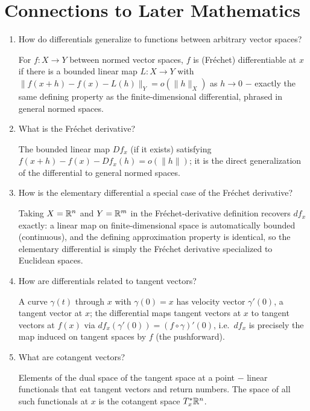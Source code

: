 \documentclass{essay}
\begin{document}
\section{Connections to Later Mathematics}

\begin{enumerate}[resume, leftmargin=*, itemsep=8pt]

\item How do differentials generalize to functions between arbitrary vector spaces?
\begin{answer}
For \(f:X\to Y\) between normed vector spaces, \(f\) is (Fr\'echet) differentiable at \(x\) if there is a bounded linear map \(L:X\to Y\) with \(\|f(x+h)-f(x)-L(h)\|_Y=o(\|h\|_X)\) as \(h\to0\) \(-\) exactly the same defining property as the finite-dimensional differential, phrased in general normed spaces.
\end{answer}

\item What is the Fr\'echet derivative?
\begin{answer}
The bounded linear map \(Df_x\) (if it exists) satisfying \(f(x+h)-f(x)-Df_x(h)=o(\|h\|)\); it is the direct generalization of the differential to general normed spaces.
\end{answer}

\item How is the elementary differential a special case of the Fr\'echet derivative?
\begin{answer}
Taking \(X=\mathbb{R}^n\) and \(Y=\mathbb{R}^m\) in the Fr\'echet-derivative definition recovers \(df_x\) exactly: a linear map on finite-dimensional space is automatically bounded (continuous), and the defining approximation property is identical, so the elementary differential is simply the Fr\'echet derivative specialized to Euclidean spaces.
\end{answer}

\item How are differentials related to tangent vectors?
\begin{answer}
A curve \(\gamma(t)\) through \(x\) with \(\gamma(0)=x\) has velocity vector \(\gamma'(0)\), a tangent vector at \(x\); the differential maps tangent vectors at \(x\) to tangent vectors at \(f(x)\) via \(df_x(\gamma'(0))=(f\circ\gamma)'(0)\), i.e.\ \(df_x\) is precisely the map induced on tangent spaces by \(f\) (the pushforward).
\end{answer}

\item What are cotangent vectors?
\begin{answer}
Elements of the dual space of the tangent space at a point \(-\) linear functionals that eat tangent vectors and return numbers. The space of all such functionals at \(x\) is the cotangent space \(T_x^*\mathbb{R}^n\).
\end{answer}


\end{enumerate}
\end{document}

